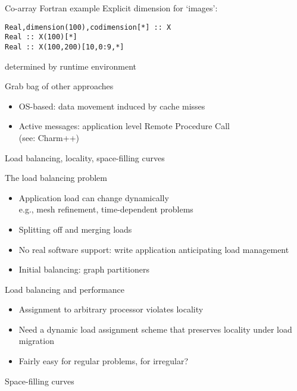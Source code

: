\begin{numberedframe}{Co-array Fortran example}
Explicit dimension for `images':
\begin{lstlisting}
Real,dimension(100),codimension[*] :: X
Real :: X(100)[*]
Real :: X(100,200)[10,0:9,*]
\end{lstlisting}
determined by runtime environment
\end{numberedframe}

\begin{numberedframe}{Grab bag of other approaches}
  \begin{itemize}
  \item OS-based: data movement induced by cache misses
  \item Active messages: application level Remote Procedure Call\\
    (see: Charm++)
  \end{itemize}
\end{numberedframe}

 {Load balancing, locality, space-filling curves}

\begin{numberedframe}{The load balancing problem}
  \begin{itemize}
  \item Application load can change dynamically\\
    e.g., mesh refinement, time-dependent problems
  \item Splitting off and merging loads 
  \item No real software support: write application anticipating load management
  \item Initial balancing: graph partitioners
  \end{itemize}
\end{numberedframe}

\begin{numberedframe}{Load balancing and performance}
  \begin{itemize}
  \item Assignment to arbitrary processor violates locality
  \item Need a dynamic load assignment scheme that preserves
    locality under load migration
  \item Fairly easy for regular problems, for irregular?
  \end{itemize}
\end{numberedframe}

 {Space-filling curves}

